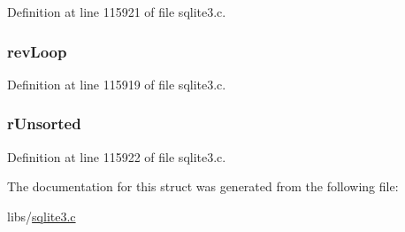 Definition at line 115921 of file sqlite3.\+c.

\hypertarget{struct_where_path_a1cd81ce561c7c4c4080875ba1c6a00cb}{}
\subsubsection[{rev\+Loop}]{ rev\+Loop}\label{struct_where_path_a1cd81ce561c7c4c4080875ba1c6a00cb}


Definition at line 115919 of file sqlite3.\+c.

\hypertarget{struct_where_path_a1a049427d4fee27af69080f248efbef0}{}
\subsubsection[{r\+Unsorted}]{ r\+Unsorted}\label{struct_where_path_a1a049427d4fee27af69080f248efbef0}


Definition at line 115922 of file sqlite3.\+c.



The documentation for this struct was generated from the following file\+:\begin{DoxyCompactItemize}
\item 
libs/\hyperlink{sqlite3_8c}{sqlite3.\+c}\end{DoxyCompactItemize}
